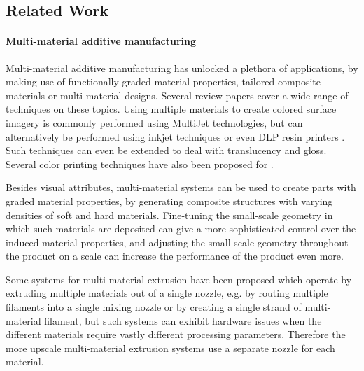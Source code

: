 \subsection{Related Work}\label{interlocking:sec:related_work}

\paragraph{Multi-material additive manufacturing}
Multi-material additive manufacturing has unlocked a plethora of applications, by making use of functionally graded material properties, tailored composite materials or multi-material designs.
Several review papers cover a wide range of techniques on these topics.\cite{Vaezi2013,Rafiee2020}
Using multiple materials to create colored surface imagery is commonly performed using MultiJet technologies, but can alternatively be performed using inkjet techniques\cite{sachs1994three} or even DLP resin printers \cite{Zhou2011Development}.
Such techniques can even be extended to deal with translucency\cite{Brunton2018} and gloss\cite{elkhuizen2019gloss}.
Several color printing techniques have also been proposed for .\cite{reiner2014dual,Song2019,Kuipers2018}

Besides visual attributes, multi-material systems can be used to create parts with graded material properties, by generating composite structures with varying densities of soft and hard materials.\cite{Cho2003851}
Fine-tuning the small-scale geometry in which such materials are deposited can give a more sophisticated control over the induced material properties,\cite{Leung2019,mirzaali2020}
and adjusting the small-scale geometry throughout the product on a  scale can increase the performance of the product even more.\cite{Zhu2017}

Some  systems for multi-material extrusion have been proposed which operate by extruding multiple materials out of a single nozzle, e.g. by routing multiple filaments into a single mixing nozzle\cite{diamondhotend} or by creating a single strand of multi-material filament\cite{Takahashi2020,Mosaic2015},
but such systems can exhibit hardware issues when the different materials require vastly different processing parameters.
Therefore the more upscale multi-material extrusion systems use a separate nozzle for each material.\cite{UltimakerS5}



